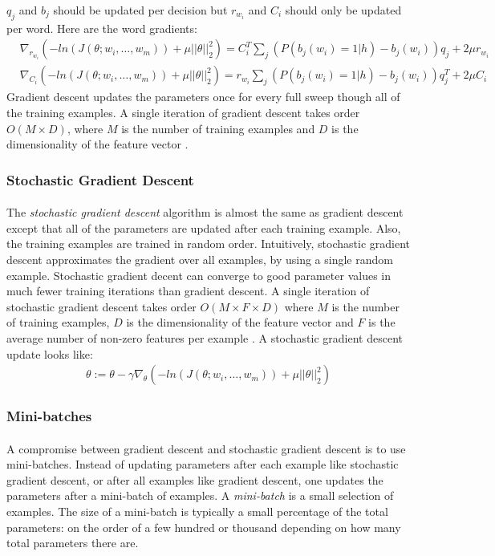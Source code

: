 $q_j$ and $b_j$ should be updated per decision but $r_{w_i}$ and $C_i$ should only be updated per word. Here are the word gradients:
\begin{align}
& \nabla_{r_{w_i}} \left( -ln(J(\theta;w_i,\dots, w_m)) +  \mu ||\theta||^2_2 \right)  =  C_i^T \sum_j \left( P \left(b_j(w_i) = 1 | h \right)  - b_j(w_i) \right)q_j +2\mu r_{w_i} \nonumber
\\
& \nabla_{C_i} \left( -ln(J(\theta;w_i,\dots, w_m)) +  \mu ||\theta||^2_2 \right)  =  r_{w_i} \sum_j \left( P \left(b_j(w_i) = 1 | h \right) - b_j(w_i) \right) q_j^T  +2\mu C_i
\end{align}
Gradient descent updates the parameters once for every full sweep though all of the training examples. A single iteration of gradient descent takes order $O(M\times D)$, where $M$ is the number of training examples and $D$ is the dimensionality of the feature vector \cite{Elkan2013}. 

\subsubsection{Stochastic Gradient Descent}
\paragraph{}
The \emph{stochastic gradient descent} algorithm is almost the same as gradient descent except that all of the parameters are updated after each training example. Also, the training examples are trained in random order. Intuitively, stochastic gradient descent approximates the gradient over all examples, by using a single random example. Stochastic gradient decent can converge to good parameter values in much fewer training iterations than gradient descent. A single iteration of stochastic gradient descent takes order $O(M\times F \times D)$ where $M$ is the number of training examples, $D$ is the dimensionality of the feature vector and $F$ is the average number of non-zero features per example \cite{Elkan2013}. 
A stochastic gradient descent update looks like:
\begin{align}
\theta := \theta - \gamma \nabla_\theta \left( -ln(J(\theta;w_i,\dots, w_m)) +  \mu ||\theta||^2_2 \right)
\end{align}
\subsubsection{Mini-batches}
\paragraph{}
A compromise between gradient descent and stochastic gradient descent is to use mini-batches. Instead of updating parameters after each example like stochastic gradient descent, or after all examples like gradient descent, one updates the parameters after a mini-batch of examples. A \emph{mini-batch} is a small selection of examples. The size of a mini-batch is typically a small percentage of the total parameters: on the order of a few hundred or thousand depending on how many total parameters there are.


